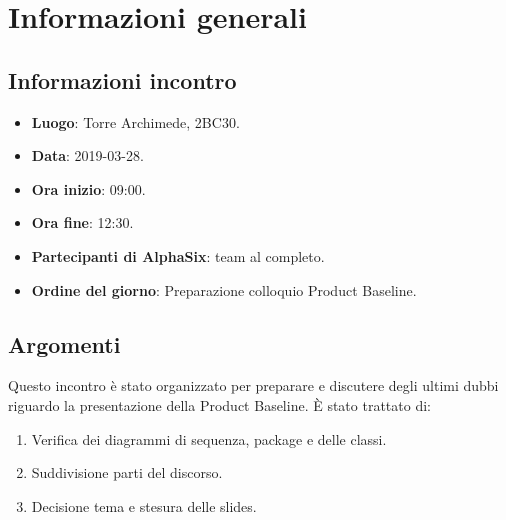 \newcommand{\documento}{\VI}
\newcommand{\nomedocumentofisico}{VI\_2019-03-28.pdf}
\newcommand{\redazione}{\SG}
\newcommand{\verifica}{\CV}
\newcommand{\approvazione}{\NC}
\newcommand{\versione}{1.0.0}
\newcommand{\uso}{Interno}
\newcommand{\destinateTo}{\gruppo}
\newcommand{\datacreazione}{29 marzo 2019}
\newcommand{\datamodifica}{31 marzo 2019}
\newcommand{\stato}{Approvato}

\def\TABELLE{false}	%
\def\FIGURE{false} 	%






    

    	
    
    \section{Informazioni generali}
		\subsection{Informazioni incontro}
			\begin{itemize}
				\item \textbf{Luogo}: Torre Archimede, 2BC30.
				\item \textbf{Data}: 2019-03-28.
				\item \textbf{Ora inizio}: 09:00.
				\item \textbf{Ora fine}: 12:30.
				\item \textbf{Partecipanti di AlphaSix}: team al completo.
				\item \textbf{Ordine del giorno}: Preparazione colloquio Product Baseline.
			\end{itemize}

        \subsection{Argomenti}
            Questo incontro è stato organizzato per preparare e discutere degli ultimi dubbi riguardo la presentazione della Product Baseline. È stato trattato di:
            \begin{enumerate}
                \item Verifica dei diagrammi di sequenza, package e delle classi.
                \item Suddivisione parti del discorso.
                \item Decisione tema e stesura delle slides.
            \end{enumerate}
            
